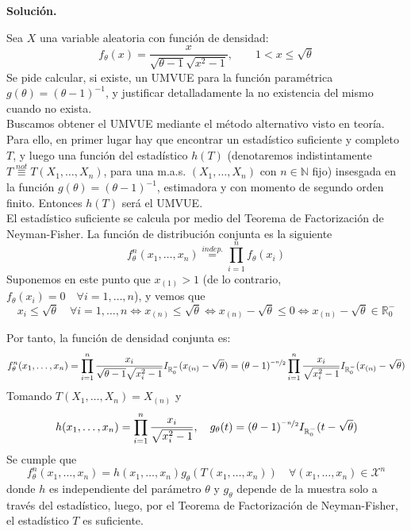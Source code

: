 \documentclass[12pt]{article}
\newcommand{\R}{\mathbb{R}}
\newcommand{\X}{\mathcal{X}}
\newcommand{\N}{\mathbb{N}}
\begin{document}
    \newpage
    \setcounter{ejercicio}{0} %
    \noindent
    \textbf{Solución.}

    \begin{ejercicio}[1.9 puntos]
        Sea $X$ una variable aleatoria con función de densidad:
        \begin{equation*}
            f_\theta(x) = \frac{x}{\sqrt{\theta-1}\sqrt{x^2-1}}, \qquad 1<x\leq \sqrt{\theta}
        \end{equation*}
        Se pide calcular, si existe, un UMVUE para la función paramétrica $g(\theta) = {(\theta-1)}^{-1}$, y justificar detalladamente la no existencia del mismo cuando no exista. \\

        Buscamos obtener el UMVUE mediante el método alternativo visto en teoría. Para ello, en primer lugar hay que encontrar un estadístico suficiente y completo $T$, y luego una función del estadístico $h(T)$
        (denotaremos indistintamente $T \stackrel{not}{\equiv} T(X_1, \ldots, X_n)$, para una m.a.s. $(X_1, \ldots, X_n)$ con $n \in \N$ fijo) insesgada en la función $g(\theta) = (\theta-1)^{-1}$, estimadora y con momento de segundo orden finito. Entonces $h(T)$ será el UMVUE. \\

        El estadístico suficiente se calcula por medio del Teorema de Factorización de Neyman-Fisher. La función de distribución conjunta es la siguiente
        $$f^n_\theta(x_1, \ldots, x_n) \stackrel{indep.}{=} \prod_{i=1}^{n} f_\theta(x_i)$$
        Suponemos en este punto que $x_{(1)} > 1$ (de lo contrario, $f_\theta(x_i) = 0 \quad \forall i = 1, \ldots, n$), y vemos que 
        $$x_i \leq \sqrt{\theta} \quad \forall i = 1, \ldots, n \iff x_{(n)} \leq \sqrt{\theta} \iff x_{(n)} - \sqrt{\theta} \leq 0 \iff x_{(n)} - \sqrt{\theta} \in \R_0^{-}$$

        Por tanto, la función de densidad conjunta es:
        $$f^n_\theta(x_1, \ldots, x_n) = \prod_{i=1}^{n} \frac{x_i}{\sqrt{\theta-1}\sqrt{x_i^2-1}} I_{\R_0^{-}}(x_{(n)} - \sqrt{\theta}) = 
        (\theta-1)^{\nicefrac{-n}{2}} \prod_{i=1}^{n} \frac{x_i}{\sqrt{x_i^2-1}} I_{\R_0^{-}}(x_{(n)} - \sqrt{\theta})$$
        Tomando $T(X_1, \ldots, X_n) = X_{(n)}$ y 
        $$h(x_1, \ldots, x_n) = \prod_{i=1}^{n} \frac{x_i}{\sqrt{x_i^2-1}}, \quad g_\theta(t) = 
        (\theta-1)^{\nicefrac{-n}{2}} I_{\R_0^{-}}(t - \sqrt{\theta})$$
        Se cumple que 
        $$f^n_\theta(x_1, \ldots, x_n) = h(x_1, \ldots, x_n) g_\theta(T(x_1, \ldots, x_n)) \quad \forall (x_1, \ldots, x_n) \in \X^n$$
        donde $h$ es independiente del parámetro $\theta$ y $g_\theta$ depende de la muestra solo a través del estadístico, luego,
        por el Teorema de Factorización de Neyman-Fisher, el estadístico $T$ es suficiente.\\



\end{ejercicio}
\end{document}
